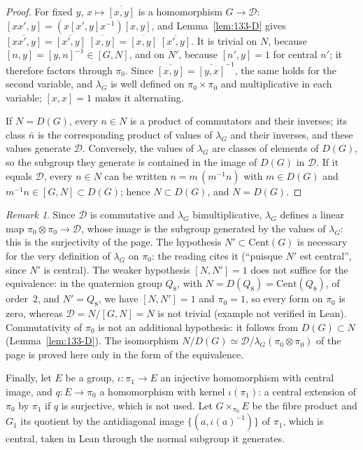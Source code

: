 \documentclass[11pt]{article}
\newcommand{\q}[1]{“#1”}
\theoremstyle{plain}
\theoremstyle{definition}
\theoremstyle{remark}
\newtheorem*{remarque}{Remark}
\begin{document}
\begin{proof}
For fixed $y$, $x \mapsto \overline{[x, y]}$ is a homomorphism $G \to \mathcal D$: $[xx', y] = (x[x', y]x^{-1})[x, y]$, and Lemma~\ref{lem:133-D} gives $\overline{[xx', y]} = \overline{[x', y]}\;\overline{[x, y]} = \overline{[x, y]}\;\overline{[x', y]}$. It is trivial on $N$, because $[n, y] = [y, n]^{-1} \in [G, N]$, and on $N'$, because $[n', y] = 1$ for central $n'$; it therefore factors through $\pi_0$. Since $\overline{[x, y]} = \overline{[y, x]}^{-1}$, the same holds for the second variable, and $\lambda_G$ is well defined on $\pi_0 \times \pi_0$ and multiplicative in each variable; $[x, x] = 1$ makes it alternating.

If $N = D(G)$, every $n \in N$ is a product of commutators and their inverses; its class $\bar n$ is the corresponding product of values of $\lambda_G$ and their inverses, and these values generate $\mathcal D$. Conversely, the values of $\lambda_G$ are classes of elements of $D(G)$, so the subgroup they generate is contained in the image of $D(G)$ in $\mathcal D$. If it equals $\mathcal D$, every $n \in N$ can be written $n = m\,(m^{-1}n)$ with $m \in D(G)$ and $m^{-1}n \in [G, N] \subset D(G)$; hence $N \subset D(G)$, and $N = D(G)$.
\end{proof}

\begin{remarque}
Since $\mathcal D$ is commutative and $\lambda_G$ bimultiplicative, $\lambda_G$ defines a linear map $\pi_0 \otimes \pi_0 \to \mathcal D$, whose image is the subgroup generated by the values of $\lambda_G$: this is the surjectivity of the page. The hypothesis $N' \subset \mathrm{Cent}(G)$ is necessary for the very definition of $\lambda_G$ on $\pi_0$: the reading cites it (\q{puisque $N'$ est central}, since $N'$ is central). The weaker hypothesis $[N, N'] = 1$ does not suffice for the equivalence: in the quaternion group $Q_8$, with $N = D(Q_8) = \mathrm{Cent}(Q_8)$, of order~$2$, and $N' = Q_8$, we have $[N, N'] = 1$ and $\pi_0 = 1$, so every form on $\pi_0$ is zero, whereas $\mathcal D = N/[G, N] = N$ is not trivial (example not verified in Lean). Commutativity of $\pi_0$ is not an additional hypothesis: it follows from $D(G) \subset N$ (Lemma~\ref{lem:133-D}). The isomorphism $N/D(G) \simeq \mathcal D/\lambda_G(\pi_0 \otimes \pi_0)$ of the page is proved here only in the form of the equivalence.
\end{remarque}

Finally, let $E$ be a group, $\iota : \pi_1 \to E$ an injective homomorphism with central image, and $q : E \to \pi_0$ a homomorphism with kernel $\iota(\pi_1)$: a central extension of $\pi_0$ by $\pi_1$ if $q$ is surjective, which is not used. Let $G \times_{\pi_0} E$ be the fibre product and $G_1$ its quotient by the antidiagonal image $\{(a, \iota(a)^{-1})\}$ of $\pi_1$, which is central, taken in Lean through the normal subgroup it generates.
\end{document}
